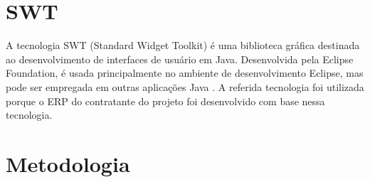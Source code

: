\section{SWT}

A tecnologia SWT (Standard Widget Toolkit) é uma biblioteca gráfica destinada ao desenvolvimento de interfaces de 
usuário em Java. Desenvolvida pela Eclipse Foundation, é usada principalmente no ambiente de desenvolvimento Eclipse, 
mas pode ser empregada em outras aplicações Java \cite{swt:explicacao}. 
A referida tecnologia foi utilizada porque o ERP do contratante do projeto 
foi desenvolvido com base nessa tecnologia.

\section{Metodologia}

